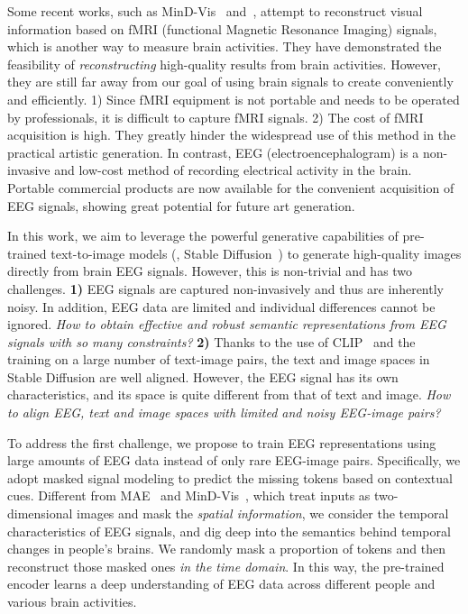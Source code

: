 \documentclass[10pt,twocolumn,letterpaper]{article}
\begin{document}
Some recent works, such as MinD-Vis~\cite{chen2022seeing} and~\cite{takagi2022high}, attempt to reconstruct visual information based on fMRI (functional Magnetic Resonance Imaging) signals, which is another way to measure brain activities. They have demonstrated the feasibility of \textit{reconstructing} high-quality results from brain activities. 
However, they are still far away from our goal of using brain signals to create conveniently and efficiently. 
1) Since fMRI equipment is not portable and needs to be operated by professionals, it is difficult to capture fMRI signals.
2) The cost of fMRI acquisition is high. 
 They greatly hinder the widespread use of this method in the practical artistic generation.
%
In contrast, EEG (electroencephalogram) is a non-invasive and low-cost method of recording electrical activity in the brain.
Portable commercial products are now available for the convenient acquisition of EEG signals, showing great potential for future art generation.

In this work, we aim to leverage the powerful generative capabilities of pre-trained text-to-image models (\ie, Stable Diffusion~\cite{rombach2022high}) to generate high-quality images directly from brain EEG signals.
However, this is non-trivial and has two challenges. 
\textbf{1)} EEG signals are captured non-invasively and thus are inherently noisy. In addition, EEG data are limited and individual differences cannot be ignored. \textit{How to obtain effective and robust semantic representations from EEG signals with so many constraints?}
%
\textbf{2)} Thanks to the use of CLIP~\cite{radford2021learning} and the training on a large number of text-image pairs, the text and image spaces in Stable Diffusion are well aligned. 
However, the EEG signal has its own characteristics, and its space is quite different from that of text and image. \textit{How to align EEG, text and image spaces with limited and noisy EEG-image pairs?}

To address the first challenge, we propose to train EEG representations using large amounts of EEG data instead of only rare EEG-image pairs. 
Specifically, we adopt masked signal modeling to predict the missing tokens based on contextual cues. Different from MAE~\cite{he2022masked} and MinD-Vis~\cite{chen2022seeing}, which treat inputs as two-dimensional images and mask the \textit{spatial information}, we consider the temporal characteristics of EEG signals, and dig deep into the semantics behind temporal changes in people's brains. 
We randomly mask a proportion of tokens and then reconstruct those masked ones \textit{in the time domain}. In this way, the pre-trained encoder learns a deep understanding of EEG data across different people and various brain activities. 
\end{document}
